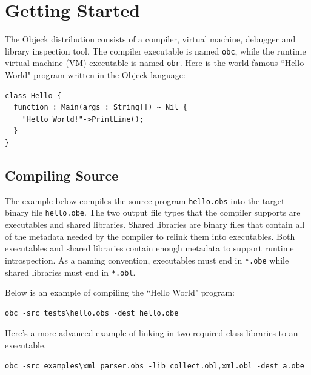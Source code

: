 \documentclass[11pt]{article}
\begin{document}
\section{Getting Started}

The Objeck distribution consists of a compiler, virtual machine,
debugger and library inspection tool.  The compiler executable is
named \texttt{obc}, while the runtime virtual machine (VM) executable
is named \texttt{obr}.  Here is the world famous ``Hello World"
program written in the Objeck language:

\begin{verbatim}
class Hello {
  function : Main(args : String[]) ~ Nil {
    "Hello World!"->PrintLine();
  }
}
\end{verbatim}

\subsection{Compiling Source}
The example below compiles the source program \texttt{hello.obs} into
the target binary file \texttt{hello.obe}.  The two output file types
that the compiler supports are executables and shared libraries.
Shared libraries are binary files that contain all of the metadata
needed by the compiler to relink them into executables.  Both
executables and shared libraries contain enough metadata to support
runtime introspection.  As a naming convention, executables must end
in \texttt{*.obe} while shared libraries must end in \texttt{*.obl}.

Below is an example of compiling the ``Hello World" program:
\begin{verbatim}
obc -src tests\hello.obs -dest hello.obe
\end{verbatim}

Here's a more advanced example of linking in two required class
libraries to an executable.
\begin{verbatim}
obc -src examples\xml_parser.obs -lib collect.obl,xml.obl -dest a.obe
\end{verbatim}
\end{document}
